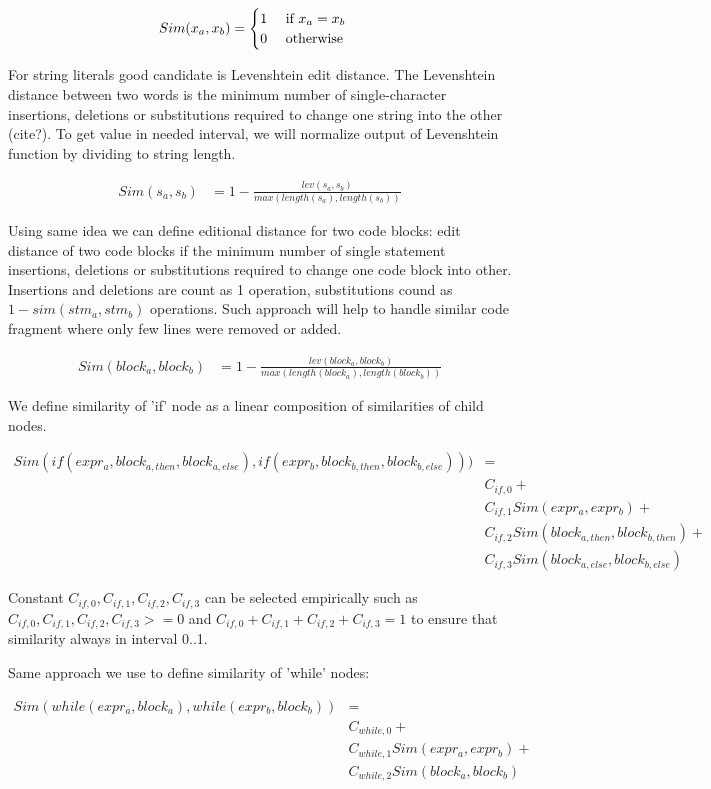 \begin{align*}
Sim(x_a, x_b) &= 
	\begin{cases} 
		\hfill 1    \hfill & \text{ if $x_a = x_b$} \\
		\hfill 0	\hfill & \text{ otherwise} \\
	\end{cases}
\end{align*}

For string literals good candidate is Levenshtein edit distance. The 
Levenshtein distance between two words is the minimum number of single-character insertions, deletions or
substitutions required to change one string into the other (cite?). To get value in needed interval, we will
normalize output of Levenshtein function by dividing to string length.

\begin{align*}
Sim(s_a, s_b) &= 1 - \frac{lev(s_a,s_b)}{max(length(s_a), length(s_b))}
\end{align*}

Using same idea we can define editional distance for two code blocks:
edit distance of two code blocks if the minimum number of single statement insertions, deletions or
substitutions required to change one code block into other. Insertions and deletions are count as 1 operation,
substitutions cound as $1 - sim(stm_a, stm_b)$ operations. Such approach will help to handle similar code fragment where
only few lines were removed or added.

\begin{align*}
	Sim(block_a, block_b) &= 1 - \frac{lev(block_a,block_b)}{max(length(block_a), length(block_b))}
\end{align*}

We define similarity of 'if' node as a linear composition of similarities of child nodes. 

\begin{align*}
	Sim(if(expr_a, block_{a,then}, block_{a,else}), if(expr_b, block_{b,then}, block_{b,else}))) &= \\
	&C_{if,0} + \\
	&C_{if,1} Sim(expr_a, expr_b) + \\
	&C_{if,2} Sim(block_{a,then}, block_{b,then}) + \\
	&C_{if,3} Sim(block_{a,else}, block_{b,else})
\end{align*}

Constant $C_{if,0}, C_{if,1}, C_{if,2}, C_{if,3}$ can be selected empirically such as $C_{if,0}, C_{if,1},
C_{if,2}, C_{if,3} >= 0$ and $C_{if,0} + C_{if,1} + C_{if,2} + C_{if,3} = 1$ to ensure that similarity always in interval 0..1.

Same approach we use to define similarity of 'while' nodes:

\begin{align*}
	Sim(while(expr_a, block_a), while(expr_b, block_b)) &= \\
	&C_{while,0} + \\
	&C_{while,1} Sim(expr_a, expr_b) + \\
	&C_{while,2} Sim(block_a, block_b)
\end{align*}




